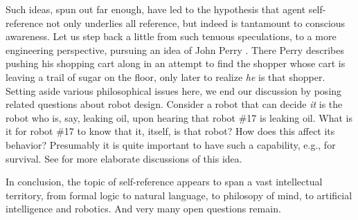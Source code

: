 \documentclass{amsart}
\begin{document}
Such ideas, spun out far enough, have led to the hypothesis
\cite{perlis97:consciousness} that agent self-reference not only
underlies all reference, but indeed is tantamount to conscious
awareness.  Let us step back a little from such tenuous speculations,
to a more engineering perspective, pursuing an idea of John Perry 
\cite{perry:problem}.  There Perry describes pushing his shopping
cart along in an attempt to find the shopper whose cart is leaving a
trail of sugar on the floor, only later to realize  {\em he} is that
shopper. Setting aside various philosophical issues here, we end our
discussion by posing related questions about robot design.
Consider a robot that can decide {\em it} is the
robot who is, say, leaking oil, upon hearing that robot \#17 is leaking
oil. What is it for robot \#17 to know that it, itself, is that robot?
How does this affect its behavior?  Presumably it is quite important
to have such a capability, e.g., for survival.  See
\cite{perlis:intentionality,anderson/perlis:roots} for more elaborate
discussions of this idea.

In conclusion, the topic of self-reference appears to span a vast
intellectual territory, from formal logic to natural language, to
philosopy of mind, to artificial intelligence and robotics.  And very many
open questions remain.




\end{document}
